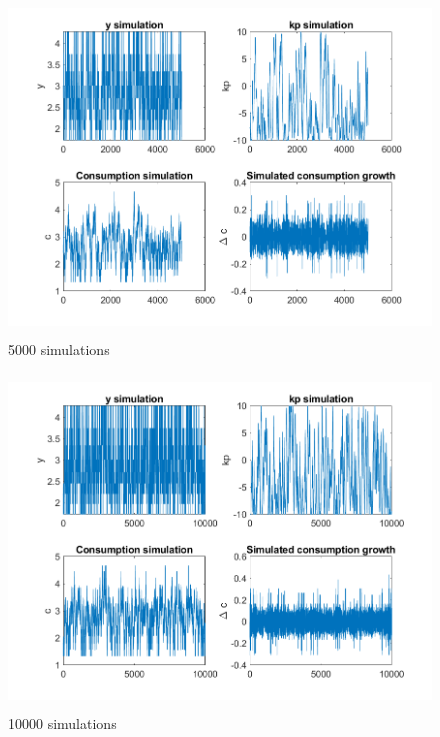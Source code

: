 \documentclass[11pt,letter]{article}
\begin{document}
\begin{figure}[t!]
	\centering
	\includegraphics[height=3.5in]{simulations5500.png}
	\caption{5000 simulations}
	\label{fig:sim5500}
\end{figure}

\begin{figure}[t!]
	\centering
	\includegraphics[height=3.5in]{simulations10500.png}
	\caption{10000 simulations}
	\label{fig:sim10500}
\end{figure}
\end{document}
